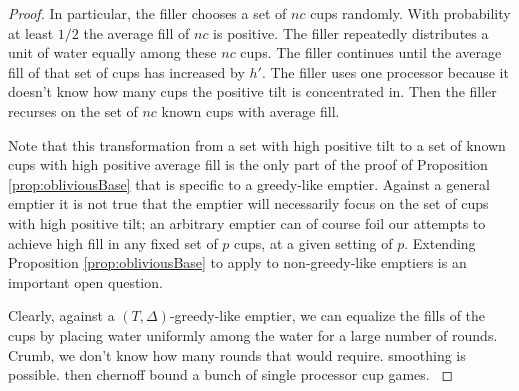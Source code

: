 \documentclass[twocolumn]{article}[10pt]
\begin{document}
\begin{proof}
{  In particular, the filler chooses a set of $nc$ cups randomly.
  With probability at least $1/2$ the average fill of $nc$ is positive.
  The filler repeatedly distributes a unit of water equally among these $nc$ cups. 
  The filler continues until the average fill of that set of cups has increased
  by $h'$. The filler uses one processor because it doesn't know how many cups
  the positive tilt is concentrated in. Then the filler recurses on the set of
  $nc$ known cups with average fill.

  Note that this transformation from a set with high positive tilt to a set of
  known cups with high positive average fill is the only part of the proof of
  Proposition \ref{prop:obliviousBase} that is specific to a greedy-like
  emptier. Against a general emptier it is not true that the emptier will
  necessarily focus on the set of cups with high positive tilt; an arbitrary
  emptier can of course foil our attempts to achieve high fill in any fixed set
  of $p$ cups, at a given setting of $p$. Extending Proposition
  \ref{prop:obliviousBase} to apply to non-greedy-like emptiers is an important
  open question.
  }
  {\color{blue}
    Clearly, against a $(T, \Delta)$-greedy-like emptier, we can equalize the
    fills of the cups by placing water uniformly among the water for a large
    number of rounds. Crumb, we don't know how many rounds that would require.
    smoothing is possible. then chernoff bound a bunch of single processor cup games.
  }
\end{proof}
\end{document}
